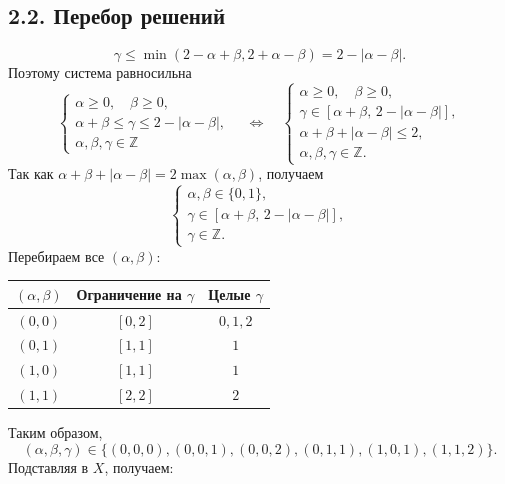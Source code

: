 \documentclass[12pt,a4paper]{article}
\begin{document}
\newpage
\subsection*{2.2. Перебор решений}
\[
\gamma\leq\min(2-\alpha+\beta,2+\alpha-\beta)=2-|\alpha-\beta|.
\]
Поэтому система равносильна
\[
\begin{cases}
\alpha\geq0,\quad\beta\geq0,\\
\alpha+\beta\leq\gamma\leq2-|\alpha-\beta|,\\
\alpha,\beta,\gamma\in\mathbb Z
\end{cases}
\quad\Longleftrightarrow\quad
\begin{cases}
\alpha\geq0,\quad\beta\geq0,\\
\gamma\in[\alpha+\beta,\,2-|\alpha-\beta|],\\
\alpha+\beta+|\alpha-\beta|\leq2,\\
\alpha,\beta,\gamma\in\mathbb Z.
\end{cases}
\]
Так как $\alpha+\beta+|\alpha-\beta|=2\max(\alpha,\beta)$, получаем
\[
\begin{cases}
\alpha,\beta\in\{0,1\},\\
\gamma\in[\alpha+\beta,\,2-|\alpha-\beta|],\\
\gamma\in\mathbb Z.
\end{cases}
\]
Перебираем все $(\alpha,\beta)$:
\begin{center}
\begin{tabular}{ccc}
\toprule
$(\alpha,\beta)$ & Ограничение на $\gamma$ & Целые $\gamma$\\
\midrule
$(0,0)$ & $[0,2]$ & $0,1,2$\\
$(0,1)$ & $[1,1]$ & $1$\\
$(1,0)$ & $[1,1]$ & $1$\\
$(1,1)$ & $[2,2]$ & $2$\\
\bottomrule
\end{tabular}
\end{center}
Таким образом,
\[
(\alpha,\beta,\gamma)\in
\{(0,0,0),(0,0,1),(0,0,2),(0,1,1),(1,0,1),(1,1,2)\}.
\]
Подставляя в $X$, получаем:
\end{document}
